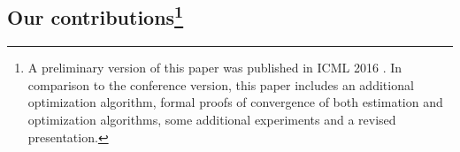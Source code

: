 % 

%
%

\subsection*{Our contributions\footnote{A preliminary version of this paper was published in ICML 2016 \cite{la2016cumulative}. In comparison to the conference version, this paper includes an additional optimization algorithm, formal proofs of convergence of both estimation and optimization algorithms, some additional experiments and a revised presentation.}}

